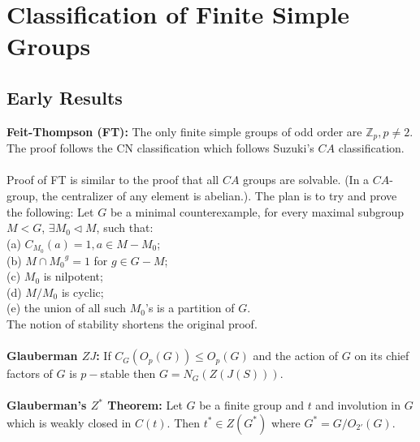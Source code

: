 \chapter{Classification of Finite Simple Groups}
\section{Early Results}
{\bf Feit-Thompson (FT):}  The only finite simple groups of odd order are
${\mathbb Z}_p, p\ne 2$. The proof follows the CN classification which follows
Suzuki's $CA$ classification.\\
\\
Proof of FT is similar to the proof that all $CA$ groups are solvable. (In a $CA$-group,
the centralizer of any element is abelian.).  The plan is to try and prove the following:
Let $G$ be a minimal counterexample, for every maximal subgroup $M<G$, $\exists M_0 \lhd M$,
such that:\\
(a) $C_{M_0}(a) =1, a \in M - M_0$;\\
(b) $M \cap {M_0}^g = 1$ for $g \in G-M$;\\
(c) $M_0$ is nilpotent;\\
(d) $M/M_0$ is cyclic; \\
(e) the union of all such $M_0$'s is a partition of $G$.\\
The notion of stability shortens the original proof.
\\
\\
{\bf Glauberman $ZJ$:}  If $C_G(O_p(G)) \le O_p(G)$ and the action of
$G$ on its chief factors of $G$ is $p-$stable then $G=N_G(Z(J(S)))$. \\
\\
{\bf Glauberman's $Z^*$ Theorem:}
Let $G$ be a finite group and $t$ and involution in $G$ which is weakly closed in
$C(t)$.  Then $t^* \in Z(G^*)$  where $G^*= G/O_{2'} (G)$.
